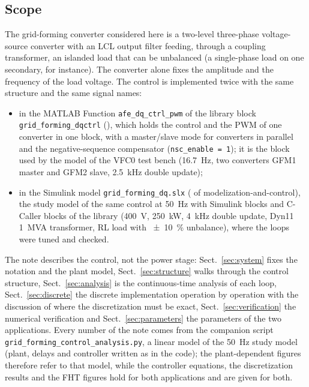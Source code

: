 \documentclass[10pt,a4paper]{scrartcl}
\newcommand{\code}[1]{\texttt{#1}}
\begin{document}

\tableofcontents
\newpage
\begin{onehalfspace}

\section{Scope}
\label{sec:scope}

The grid-forming converter considered here is a two-level three-phase voltage-source converter with an LCL output filter feeding, through a coupling transformer, an islanded load that can be unbalanced (a single-phase load on one secondary, for instance). The converter alone fixes the amplitude and the frequency of the load voltage. The control is implemented twice with the same structure and the same signal names:
\begin{itemize}
\item in the MATLAB Function \code{afe\_dq\_ctrl\_pwm} of the library block \code{grid\_forming\_dqctrl} (), which holds the control and the PWM of one converter in one block, with a master/slave mode for converters in parallel and the negative-sequence compensator (\code{nsc\_enable = 1}); it is the block used by the model of the VFC0 test bench (\SI{16.7}{Hz}, two converters GFM1 master and GFM2 slave, \SI{2.5}{kHz} double update);
\item in the Simulink model \code{grid\_forming\_dq.slx} ( of modelization-and-control), the study model of the same control at \SI{50}{Hz} with Simulink blocks and C-Caller blocks of the library (\SI{400}{V}, \SI{250}{kW}, \SI{4}{kHz} double update, Dyn11 \SI{1}{MVA} transformer, RL load with \SI{\pm 10}{\percent} unbalance), where the loops were tuned and checked.
\end{itemize}
The note describes the control, not the power stage: Sect.~\ref{sec:system} fixes the notation and the plant model, Sect.~\ref{sec:structure} walks through the control structure, Sect.~\ref{sec:analysis} is the continuous-time analysis of each loop, Sect.~\ref{sec:discrete} the discrete implementation operation by operation with the discussion of where the discretization must be exact, Sect.~\ref{sec:verification} the numerical verification and Sect.~\ref{sec:parameters} the parameters of the two applications. Every number of the note comes from the companion script \code{grid\_forming\_control\_analysis.py}, a linear model of the \SI{50}{Hz} study model (plant, delays and controller written as in the code); the plant-dependent figures therefore refer to that model, while the controller equations, the discretization results and the FHT figures hold for both applications and are given for both.


\end{onehalfspace}
\end{document}
